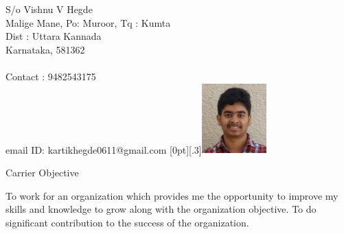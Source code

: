 \documentclass{resume} %
\begin{document}
\begin{rSection}{}

 S/o Vishnu V Hegde 
 \\Malige Mane, Po: Muroor, Tq : Kumta  
 \\Dist : Uttara Kannada 
 \\Karnataka, 581362\\
 \\Contact : 9482543175
 \\email ID: kartikhegde0611@gmail.com\hfill 
 \raisebox{-.1\totalheight}[0pt][.3\totalheight]{\includegraphics[width=2.5cm,height=2.7cm]{kartik.png}}

\end{rSection}


\vspace{1cm}


\begin{rSection}{Carrier Objective}

 To work for an organization which provides me the opportunity to improve my skills and knowledge to grow along with the organization objective. To do significant contribution to the success of the organization.
 
\end{rSection}


\vspace{1cm}


\end{document}
